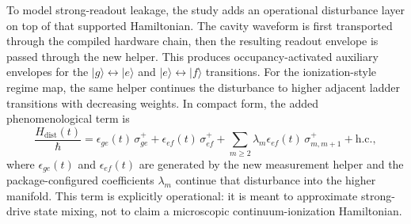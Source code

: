 \documentclass[11pt, a4paper]{article}
\begin{document}
To model strong-readout leakage, the study adds an operational disturbance layer on top of that supported Hamiltonian. The cavity waveform is first transported through the compiled hardware chain, then the resulting readout envelope is passed through the new
 helper. This produces occupancy-activated auxiliary envelopes for the
$|g\rangle \leftrightarrow |e\rangle$
and
$|e\rangle \leftrightarrow |f\rangle$
transitions. For the ionization-style regime map, the same helper continues the disturbance to higher adjacent ladder transitions with decreasing weights. In compact form, the added phenomenological term is
\begin{equation}
\frac{H_{\mathrm{dist}}(t)}{\hbar}
=
\epsilon_{ge}(t)\, \sigma_{ge}^{+}
+ \epsilon_{ef}(t)\, \sigma_{ef}^{+}
+ \sum_{m\ge 2}\lambda_m \epsilon_{ef}(t)\, \sigma_{m,m+1}^{+}
+ \mathrm{h.c.},
\end{equation}
where $\epsilon_{ge}(t)$ and $\epsilon_{ef}(t)$ are generated by the new measurement helper and the package-configured coefficients $\lambda_m$ continue that disturbance into the higher manifold. This term is explicitly operational: it is meant to approximate strong-drive state mixing, not to claim a microscopic continuum-ionization Hamiltonian.
\end{document}

